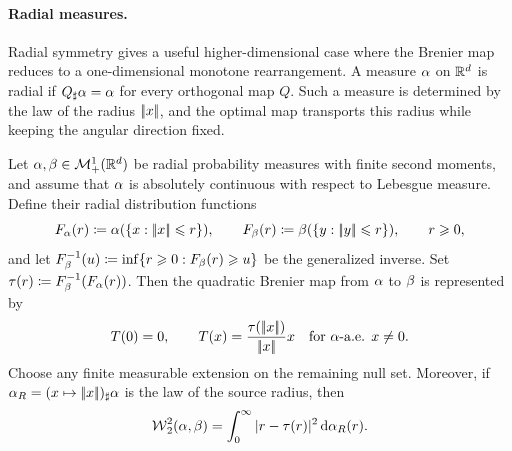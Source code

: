 \paragraph{Radial measures.}

Radial symmetry gives a useful higher-dimensional case where the Brenier map reduces to a one-dimensional monotone rearrangement. A measure $\alpha$ on $\mathbb{R}^d$ is radial if $Q_\sharp\alpha=\alpha$ for every orthogonal map $Q$. Such a measure is determined by the law of the radius $|\!| x |\!|$, and the optimal map transports this radius while keeping the angular direction fixed.

\begin{prop}\label{prop-radial-transport}
	Let $\alpha,\beta\in\mathcal{M}_+^1(\mathbb{R}^d)$ be radial probability measures with finite second moments, and assume that $\alpha$ is absolutely continuous with respect to Lebesgue measure. Define their radial distribution functions
	\[
		F_\alpha(r)\coloneqq \alpha(\{x:|\!| x |\!|\leqslant r\}),
		\qquad
		F_\beta(r)\coloneqq \beta(\{y:|\!| y |\!|\leqslant r\}),
		\qquad r\geqslant0,
	\]
	and let $F_\beta^{-1}(u)\coloneqq\inf\{r\geqslant0:F_\beta(r)\geqslant u\}$ be the generalized inverse.
	Set $\tau(r)\coloneqq F_\beta^{-1}(F_\alpha(r))$.
	Then the quadratic Brenier map from $\alpha$ to $\beta$ is represented by
	\[
		T(0)=0,
		\qquad
		T(x)=\frac{\tau(|\!| x |\!|)}{|\!| x |\!|}x
		\quad\text{for }\alpha\text{-a.e. }x\neq0.
	\]
	Choose any finite measurable extension on the remaining null set.
	Moreover, if $\alpha_R=(x\mapsto|\!| x |\!|)_\sharp\alpha$ is the law of the source radius, then
	\[
		\operatorname{\mathcal{W}}_2^2(\alpha,\beta)
		=
		\int_0^\infty |r-\tau(r)|^2\,\mathrm{d}\alpha_R(r).
	\]
\end{prop}
